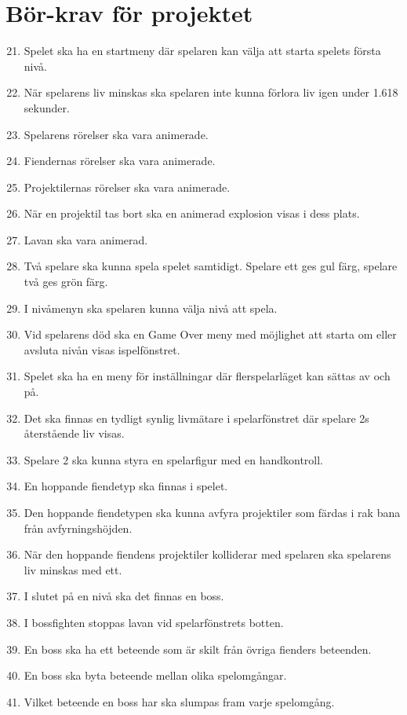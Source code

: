 \documentclass{TDP005mall}
\begin{document}
\section{Bör-krav för projektet}

\begin{enumerate}
\setcounter{enumi}{20}
\item Spelet ska ha en startmeny där spelaren kan välja att starta spelets första nivå.
\item När spelarens liv minskas ska spelaren inte kunna förlora liv igen under 1.618 sekunder.
\item Spelarens rörelser ska vara animerade.
\item Fiendernas rörelser ska vara animerade.
\item Projektilernas rörelser ska vara animerade.
\item När en projektil tas bort ska en animerad explosion visas i dess plats.
\item Lavan ska vara animerad.
\item Två spelare ska kunna spela spelet samtidigt. Spelare ett ges gul färg, spelare två ges grön färg.
\item I nivåmenyn ska spelaren kunna välja nivå att spela.
\item Vid spelarens död ska en Game Over meny med möjlighet att starta om eller avsluta nivån visas ispelfönstret.
\item Spelet ska ha en meny för inställningar där flerspelarläget kan sättas av och på.
\item Det ska finnas en tydligt synlig livmätare i spelarfönstret där spelare 2s återstående liv visas.
\item Spelare 2 ska kunna styra en spelarfigur med en handkontroll.
\item En hoppande fiendetyp ska finnas i spelet.
\item Den hoppande fiendetypen ska kunna avfyra projektiler som färdas i rak bana från avfyrningshöjden.
\item När den hoppande fiendens projektiler kolliderar med spelaren ska spelarens liv minskas med ett.
\item I slutet på en nivå ska det finnas en boss.
\item I bossfighten stoppas lavan vid spelarfönstrets botten.
\item En boss ska ha ett beteende som är skilt från övriga fienders beteenden.
\item En boss ska byta beteende mellan olika spelomgångar.
\item Vilket beteende en boss har ska slumpas fram varje spelomgång.

\end{enumerate}
\end{document}
